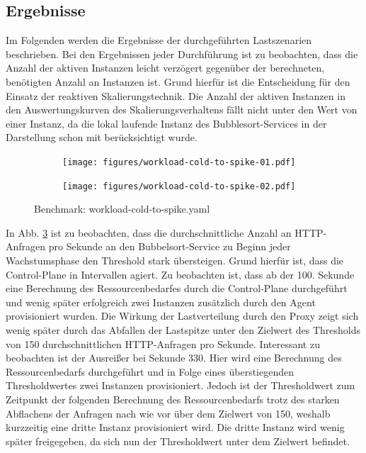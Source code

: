 \documentclass[runningheads]{llncs}
\begin{document}
\subsection{Ergebnisse}

Im Folgenden werden die Ergebnisse der durchgeführten Lastszenarien beschrieben. Bei den Ergebnissen jeder Durchführung ist zu beobachten, dass die Anzahl der aktiven Instanzen leicht verzögert gegenüber der berechneten, benötigten Anzahl an Instanzen ist. Grund hierfür ist die Entscheidung für den Einsatz der reaktiven Skalierungstechnik. Die Anzahl der aktiven Instanzen in den Auswertungskurven des Skalierungsverhaltens fällt nicht unter den Wert von einer Instanz, da die lokal laufende Instanz des Bubblesort-Services in der Darstellung schon mit berücksichtigt wurde.

\begin{figure}
	\centering
	\begin{subfigure}{.5\textwidth}
		\centering
		\texttt{[image: figures/workload-cold-to-spike-01.pdf]}
		\label{fig:sub11}
	\end{subfigure}%
	\begin{subfigure}{.5\textwidth}
		\centering
		\texttt{[image: figures/workload-cold-to-spike-02.pdf]}
		\label{fig:sub2}
	\end{subfigure}
	\caption{Benchmark: workload-cold-to-spike.yaml}
	\label{fig:benchmark_01}
\end{figure}

In Abb. \ref{fig:benchmark_01} ist zu beobachten, dass die durchschnittliche Anzahl an HTTP-Anfragen pro Sekunde an den Bubbelsort-Service zu Beginn jeder Wachstumsphase den Threshold stark übersteigen. Grund hierfür ist, dass die Control-Plane in Intervallen agiert. Zu beobachten ist, dass ab der 100. Sekunde eine Berechnung des Ressourcenbedarfes durch die Control-Plane durchgeführt und wenig  später erfolgreich zwei Instanzen zusätzlich durch den Agent provisioniert wurden. Die Wirkung der Lastverteilung durch den Proxy zeigt sich wenig später durch das Abfallen der Lastspitze unter den Zielwert des Thresholds von 150 durchschnittlichen  HTTP-Anfragen pro Sekunde. Interessant zu beobachten ist der Ausreißer bei Sekunde 330. Hier wird eine Berechnung des Ressourcenbedarfs durchgeführt und in Folge eines überstiegenden Thresholdwertes zwei Instanzen provisioniert. Jedoch ist der Thresholdwert zum Zeitpunkt der folgenden Berechnung des Ressourcenbedarfs trotz des starken Abflachens der Anfragen nach wie vor über dem Zielwert von 150, weshalb kurzzeitig eine dritte Instanz provisioniert wird. Die dritte Instanz wird wenig später freigegeben, da sich nun der Thresholdwert unter dem Zielwert befindet. \\
	
\end{document}
